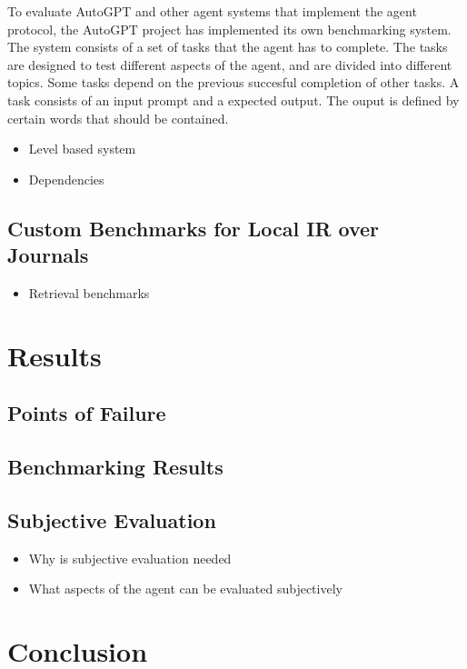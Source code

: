 \documentclass[english, version-2022-01]{uzl-thesis}
\begin{document}
To evaluate AutoGPT and other agent systems that implement the agent protocol, the AutoGPT project has implemented its own benchmarking system.
The system consists of a set of tasks that the agent has to complete. The tasks are designed to test different aspects of the agent, and are divided into different topics.
Some tasks depend on the previous succesful completion of other tasks. A task consists of an input prompt and a expected output.
The ouput is defined by certain words that should be contained.

\begin{itemize}
    \item Level based system
    \item Dependencies
\end{itemize}

\section{Custom Benchmarks for Local IR over Journals}

\begin{itemize}
    \item Retrieval benchmarks
\end{itemize}

\chapter{Results}

\section{Points of Failure}

\section{Benchmarking Results}

\section{Subjective Evaluation}

\begin{itemize}
    \item Why is subjective evaluation needed
    \item What aspects of the agent can be evaluated subjectively
\end{itemize}

\chapter{Conclusion}
\end{document}
